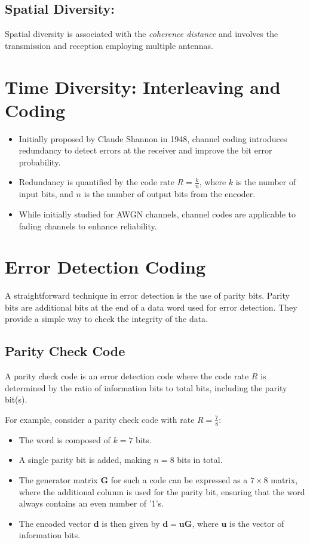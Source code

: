 \subsection*{Spatial Diversity:}
Spatial diversity is associated with the \textit{coherence distance} and involves the transmission and reception employing multiple antennas.

\section*{Time Diversity: Interleaving and Coding}
\begin{itemize}
    \item Initially proposed by Claude Shannon in 1948, channel coding introduces redundancy to detect errors at the receiver and improve the bit error probability.
    \item Redundancy is quantified by the code rate $R = \frac{k}{n}$, where $k$ is the number of input bits, and $n$ is the number of output bits from the encoder.
    \item While initially studied for AWGN channels, channel codes are applicable to fading channels to enhance reliability.
\end{itemize}



\section*{Error Detection Coding}

A straightforward technique in error detection is the use of parity bits. Parity bits are additional bits at the end of a data word used for error detection. They provide a simple way to check the integrity of the data. 

\subsection*{Parity Check Code}
A parity check code is an error detection code where the code rate \( R \) is determined by the ratio of information bits to total bits, including the parity bit(s). 

For example, consider a parity check code with rate \( R = \frac{7}{8} \):
\begin{itemize}
    \item The word is composed of \( k = 7 \) bits.
    \item A single parity bit is added, making \( n = 8 \) bits in total.
    \item The generator matrix \( \mathbf{G} \) for such a code can be expressed as a \( 7 \times 8 \) matrix, where the additional column is used for the parity bit, ensuring that the word always contains an even number of '1's.
    \item The encoded vector \( \mathbf{d} \) is then given by \( \mathbf{d} = \mathbf{uG} \), where \( \mathbf{u} \) is the vector of information bits.
\end{itemize}


